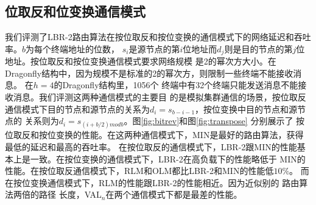 \subsection{位取反和位变换通信模式}

我们评测了LBR-2路由算法在按位取反和按位变换的通信模式下的网络延迟和吞吐率。$b$为每个终端地址的位数，
$s_i$是源节点的第$i$位地址而$d_j$则是目的节点的第$j$位地址。按位取反和按位变换通信模式要求网络规模
是2的幂次方大小。在Dragonfly结构中，因为规模不是标准的2的幂次方，则限制一些终端不能接收消息。 在$h=4$的Dragonfly结构里，1056个
终端中有32个终端只能发送消息不能接收消息。我们评测这两种通信模式的主要目
的是模拟集群通信的场景，按位取反通信模式下目的节点和源节点的关系为$d_i=s_{b-i-1}$，按位变换中目的节点和源节点的
关系则为$d_i=s_{(i+b/2) mod b}$。图\ref{fig:bitrev}和图\ref{fig:transpose} 分别展示了
按位取反和按位变换的性能。在这两种通信模式下，MIN是最好的路由算法，获得最低的延迟和最高的吞吐率。
在按位取反的通信模式下，LBR-2跟MIN的性能基本上是一致。在按位变换的通信模式下，LBR-2在高负载下的性能略低于
MIN的性能。在按位取反通信模式下，RLM和OLM都比LBR-2和MIN的性能低$10\%$。
而在按位变换通信模式下，RLM的性能跟LBR-2的性能相近。因为近似别的
路由算法两倍的路径
长度，VAL$_n$在两个通信模式下都是最差的性能。



  \begin{figure*}[htbp]
  \centering
  \begin{minipage}[t]{\textwidth}
  \centering
  \caption{位取反通信模式}
  \label{fig:bitrev}
   \end{minipage}
\end{figure*}


\begin{figure*}[htbp]
  \centering
  \begin{minipage}[t]{\textwidth}
  \centering
  \caption{位变换通信模式}
  \label{fig:transpose}
  \end{minipage}
  \end{figure*}



